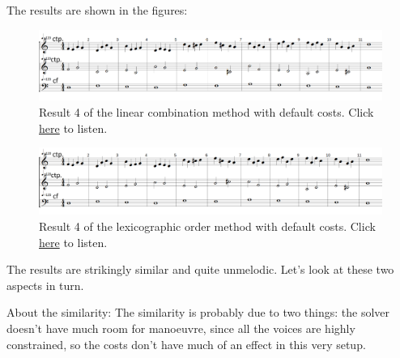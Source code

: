 The results are shown in the figures:

\begin{figure}[h]
    \centering
    \includegraphics[width=1\textwidth]{Images/Experiments/linear-combination-2sp.png}
    \caption{Result 4 of the linear combination method with default costs. Click \href{https://youtu.be/_VrM76hp1v8}{here} to listen.}
    \label{fig:combili-2sp}
\end{figure}

\begin{figure}[h]
    \centering
    \includegraphics[width=1\textwidth]{Images/Experiments/basic-lexico-2sp.png}
    \caption{Result 4 of the lexicographic order method with default costs. Click \href{https://youtu.be/msY1LOGw3v8}{here} to listen.}
    \label{fig:lexico-2sp}
\end{figure}

The results are strikingly similar and quite unmelodic. Let's look at these two aspects in turn.

About the similarity: The similarity is probably due to two things: the solver doesn't have much room for manoeuvre, since all the voices are highly constrained, so the costs don't have much of an effect in this very setup. 

